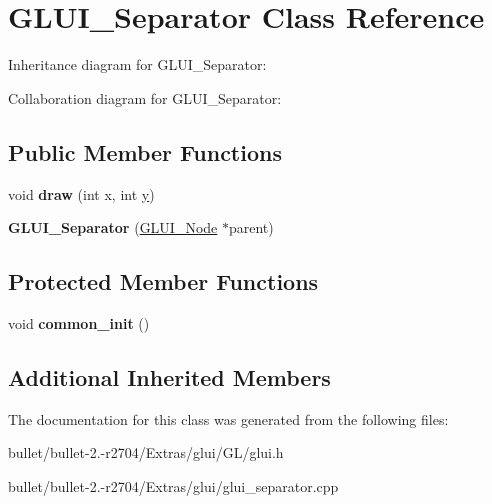 \hypertarget{class_g_l_u_i___separator}{\section{G\+L\+U\+I\+\_\+\+Separator Class Reference}
\label{class_g_l_u_i___separator}
}


Inheritance diagram for G\+L\+U\+I\+\_\+\+Separator\+:


Collaboration diagram for G\+L\+U\+I\+\_\+\+Separator\+:
\subsection*{Public Member Functions}
\begin{DoxyCompactItemize}
\item 
\hypertarget{class_g_l_u_i___separator_aff41b79985e74c612fd1445aa8f841e6}{void {\bfseries draw} (int x, int \hyperlink{_ice_utils_8h_aa7ffaed69623192258fb8679569ff9ba}{y})}\label{class_g_l_u_i___separator_aff41b79985e74c612fd1445aa8f841e6}

\item 
\hypertarget{class_g_l_u_i___separator_aaa4d14c71c705d582f84e2f33a31609c}{{\bfseries G\+L\+U\+I\+\_\+\+Separator} (\hyperlink{class_g_l_u_i___node}{G\+L\+U\+I\+\_\+\+Node} $\ast$parent)}\label{class_g_l_u_i___separator_aaa4d14c71c705d582f84e2f33a31609c}

\end{DoxyCompactItemize}
\subsection*{Protected Member Functions}
\begin{DoxyCompactItemize}
\item 
\hypertarget{class_g_l_u_i___separator_a45dd556a76d5492f16d071b6c250fcf5}{void {\bfseries common\+\_\+init} ()}\label{class_g_l_u_i___separator_a45dd556a76d5492f16d071b6c250fcf5}

\end{DoxyCompactItemize}
\subsection*{Additional Inherited Members}


The documentation for this class was generated from the following files\+:\begin{DoxyCompactItemize}
\item 
bullet/bullet-\/2.-\/r2704/\+Extras/glui/\+G\+L/glui.\+h\item 
bullet/bullet-\/2.-\/r2704/\+Extras/glui/glui\+\_\+separator.\+cpp\end{DoxyCompactItemize}
